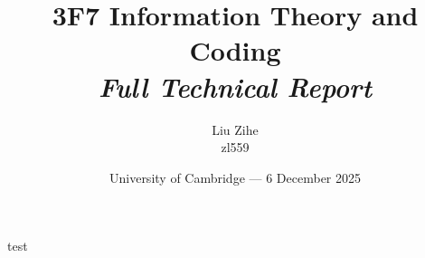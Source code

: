 \documentclass[11pt,a4paper]{article}
\title{ 3F7 Information Theory and Coding \\ \textit{Full Technical Report}} %
\author{Liu Zihe \\ zl559} %
\date{University of Cambridge --- 6 December 2025} %
\begin{document}
\maketitle %

test
\end{document}
